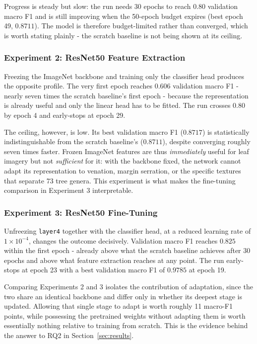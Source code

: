 \documentclass[12pt,a4paper]{article}
\begin{document}
Progress is steady but slow: the run needs 30 epochs to reach $0.80$ validation macro F1 and is still improving when the 50-epoch budget expires (best epoch 49, $0.8711$). The model is therefore budget-limited rather than converged, which is worth stating plainly - the scratch baseline is not being shown at its ceiling.

\subsubsection{Experiment 2: ResNet50 Feature Extraction}
Freezing the ImageNet backbone and training only the classifier head produces the opposite profile. The very first epoch reaches $0.606$ validation macro F1 - nearly seven times the scratch baseline's first epoch - because the representation is already useful and only the linear head has to be fitted. The run crosses $0.80$ by epoch 4 and early-stops at epoch 29.

The ceiling, however, is low. Its best validation macro F1 ($0.8717$) is statistically indistinguishable from the scratch baseline's ($0.8711$), despite converging roughly seven times faster. Frozen ImageNet features are thus \emph{immediately} useful for leaf imagery but not \emph{sufficient} for it: with the backbone fixed, the network cannot adapt its representation to venation, margin serration, or the specific textures that separate 73 tree genera. This experiment is what makes the fine-tuning comparison in Experiment 3 interpretable.

\subsubsection{Experiment 3: ResNet50 Fine-Tuning}
Unfreezing \texttt{layer4} together with the classifier head, at a reduced learning rate of $1 \times 10^{-4}$, changes the outcome decisively. Validation macro F1 reaches $0.825$ within the first epoch - already above what the scratch baseline achieves after 30 epochs and above what feature extraction reaches at any point. The run early-stops at epoch 23 with a best validation macro F1 of $0.9785$ at epoch 19.

Comparing Experiments 2 and 3 isolates the contribution of adaptation, since the two share an identical backbone and differ only in whether its deepest stage is updated. Allowing that single stage to adapt is worth roughly 11 macro-F1 points, while possessing the pretrained weights without adapting them is worth essentially nothing relative to training from scratch. This is the evidence behind the answer to RQ2 in Section~\ref{sec:results}.
\end{document}
